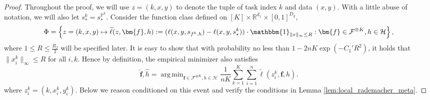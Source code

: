 \documentclass{article}
\numberwithin{equation}{section}
\def\vf{{\bm{f}}}
\newcommand{\R}{\mathbb{R}}
\DeclareMathOperator*{\argmin}{arg\,min}
\theoremstyle{definition}
\renewcommand{\P}{\mathbb{P}}
\begin{document}
\begin{proof}
    Throughout the proof, we will use $z=(k,x,y)$ to denote the tuple of task index $k$ and data $(x,y)$.
    With a little abuse of notation, we will also let $s_*^k=s_*^{\P^k}$. 
    Consider the function class defined on $[K]\times\R^{d_x}\times[0,1]^{D_y}$,
    \begin{equation}
        \Phi=\left\{z=(k,x,y)\mapsto \widetilde{\ell}(z,\vf,h):=(\ell(x,y,s_{f^k,h})-\ell(x,y,s_*^k))\cdot\mathbbm{1}_{\|x\|_\infty\leq R}: \vf\in\mathcal{F}^{\otimes K},h\in\mathcal{H}\right\},
    \end{equation}
    where $1\leq R\leq \frac{R_f}{2}$ will be specified later. 
    It is easy to show that with probability no less than $1-2nK\exp(-C_1'R^2)$, it holds that $\|x_i^k\|_\infty\leq R$ for all $i,k$. 
    Hence by definition, the empirical minimizer also satisfies
    \begin{equation}
        \widehat{\vf},\widehat{h}=\argmin_{\vf\in\mathcal{F}^{\otimes K},h\in\mathcal{H}} \frac{1}{nK}\sum_{k=1}^K\sum_{i=1}^n\widetilde{\ell}(z_i^k,\vf,h).
    \end{equation}
    where $z_i^k=(k,x_i^k,y_i^k)$. 
    Below we reason conditioned on this event and verify the conditions in Lemma \ref{lem:local_rademacher_meta}.


\end{proof}
\end{document}
